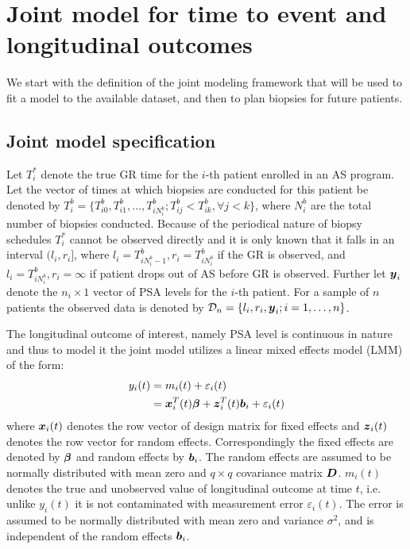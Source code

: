 
\section{Joint model for time to event and longitudinal outcomes}
\label{sec : jm_framework}
We start with the definition of the joint modeling framework that will be used to fit a model to the available dataset, and then to plan biopsies for future patients.

\subsection{Joint model specification}
\label{subsec : jm_specification}
Let $T_i^*$ denote the true GR time for the $i$-th patient enrolled in an AS program. Let the vector of times at which biopsies are conducted for this patient be denoted by $T_i^b = \{T^b_{i0}, T^b_{i1}, \ldots, T^b_{i{N_i^b}}; T^b_{ij} < T^b_{ik}, \forall j<k\}$, where $N_i^b$ are the total number of biopsies conducted. Because of the periodical nature of biopsy schedules $T_i^*$ cannot be observed directly and it is only known that it falls in an interval $(l_i, r_i]$, where $l_i = T^b_{i{N_i^b - 1}}, r_i = T^b_{i{N_i^b}}$ if the GR is observed, and $l_i = T^b_{i{N_i^b}}, r_i=\infty$ if patient drops out of AS before GR is observed. Further let $\boldsymbol{y}_i$ denote the $n_i \times 1$  vector of PSA levels for the $i$-th patient. For a sample of $n$ patients the observed data is denoted by $\mathcal{D}_n = \{l_i, r_i, \boldsymbol{y}_i; i = 1, \ldots, n\}$.

The longitudinal outcome of interest, namely PSA level is continuous in nature and thus to model it the joint model utilizes a linear mixed effects model (LMM) of the form:
\begin{equation*}
\begin{split}
y_i(t) &= m_i(t) + \varepsilon_i(t)\\
&=\boldsymbol{x}_i^T(t) \boldsymbol{\beta} + \boldsymbol{z}_i^T(t) \boldsymbol{b}_i + \varepsilon_i(t)
\end{split}
\end{equation*}
where $\boldsymbol{x}_i(t)$ denotes the row vector of design matrix for fixed effects and $\boldsymbol{z}_i(t)$ denotes the row vector for random effects. Correspondingly the fixed effects are denoted by $\boldsymbol{\beta}$ and random effects by $\boldsymbol{b}_i$. The random effects are assumed to be normally distributed with mean zero and $q \times q$ covariance matrix $\boldsymbol{D}$. $m_i(t)$ denotes the true and unobserved value of longitudinal outcome at time $t$, i.e. unlike $y_i(t)$ it is not contaminated with measurement error $\varepsilon_i(t)$. The error is assumed to be normally distributed with mean zero and variance $\sigma^2$, and is independent of the random effects $\boldsymbol{b}_i$.

